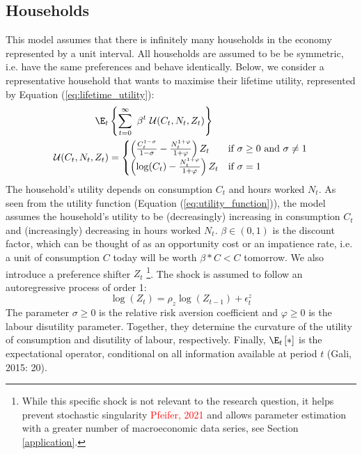 \subsection{Households}
This model assumes that there is infinitely many households in the economy represented by a unit interval. All households are assumed to be be symmetric, i.e. have the same preferences and behave identically. Below, we consider a representative household that wants to maximise their lifetime utility, represented by Equation (\ref{eq:lifetime_utility}):
\begin{align}
    \E_t &\left\{\sum^{\infty}_{t=0} \ \beta^t \ \mathcal{U}(C_t, N_t, Z_t)\right\} \label{eq:lifetime_utility}\\
    \mathcal{U}(C_t, N_t, Z_t) &= 
    \begin{cases}
        \left( \frac{C_t^{1-\sigma}}{1-\sigma} - \frac{N_t^{1+\varphi}}{1+\varphi} \right)Z_t & \text{if $\sigma \geq 0$ and $\sigma \ne 1$}\\
        \left( \log(C_t) - \frac{N_t^{1+\varphi}}{1+\varphi} \right)Z_t & \text{if $\sigma = 1$}
    \end{cases}
    \label{eq:utility_function}
\end{align}
The household's utility depends on consumption $C_t$ and hours worked $N_t$. As seen from the utility function (Equation (\ref{eq:utility_function})), the model assumes the household's utility to be (decreasingly) increasing in consumption $C_t$ and (increasingly) decreasing in hours worked $N_t$. $\beta \in (0,1)$ is the discount factor, which can be thought of as an opportunity cost or an impatience rate, i.e. a unit of consumption $C$ today will be worth $\beta * C < C$ tomorrow. We also introduce a preference shifter $Z_t$ \parencite[225]{jordigal_2015_monetary} \footnote{While this specific shock is not relevant to the research question, it helps prevent stochastic singularity \textcolor{red}{Pfeifer, 2021} and allows parameter estimation with a greater number of macroeconomic data series, see Section \ref{application}. }. The shock is assumed to follow an autoregressive process of order 1:
\begin{equation}
    \log (Z_t) = \rho_z \log (Z_{t-1}) + \epsilon^z_{t}
\end{equation}
The parameter $\sigma \geq 0$ is the relative risk aversion coefficient and $\varphi \geq 0$ is the labour disutility parameter. Together, they determine the curvature of the utility of consumption and disutility of labour, respectively. Finally, $\E_t\left[*\right]$ is the expectational operator, conditional on all information available at period $t$ (Gali, 2015: 20).
